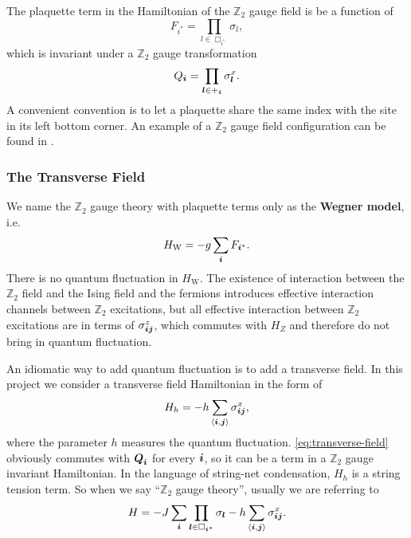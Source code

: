 \documentclass[hyperref, a4paper]{article}
\newcommand*{\pair}[1]{\langle #1 \rangle}
\newcommand*{\concept}[1]{{\textbf{#1}}}
\newcommand*{\Ztwo}{$\mathbb{Z}_2$ }
\begin{document}
The plaquette term in the Hamiltonian of the \Ztwo gauge field is be a function of
\begin{equation}
    F_{i^*} = \prod_{l \in \Box_{i^*}} \sigma_l,
\end{equation}
which is invariant under a \Ztwo gauge transformation
\begin{equation}
    Q_{\vb*{i}} = \prod_{\vb*{l} \in +_{\vb*{i}}} \sigma^x_{\vb*{l}}.
\end{equation}
A convenient convention is to let a plaquette share the same index with the site in its left bottom corner. 
An example of a \Ztwo gauge field configuration can be found in .

\subsubsection{The Transverse Field}

We name the \Ztwo gauge theory with plaquette terms only as the \concept{Wegner model}, i.e.
\begin{equation}
    H_\text{W} = - g \sum_{\vb*{i}} F_{{\vb*{i}}^*}.
\end{equation}
There is no quantum fluctuation in $H_\text{W}$. 
The existence of interaction between the \Ztwo field and the Ising field and the fermions introduces effective interaction channels between \Ztwo excitations, but all effective interaction between \Ztwo excitations are in terms of $\sigma^z_{\vb*{i} \vb*{j}}$, which commutes with $H_Z$ and therefore do not bring in quantum fluctuation.

An idiomatic way to add quantum fluctuation is to add a transverse field.
In this project we consider a transverse field Hamiltonian in the form of 
\begin{equation}
    H_h = - h \sum_{\pair{\vb*{i}, \vb*{j}}} \sigma_{\vb*{i} \vb*{j}}^x ,
    \label{eq:transverse-field}
\end{equation}
where the parameter $h$ measures the quantum fluctuation.
\eqref{eq:transverse-field} obviously commutes with $\vb*{Q}_{\vb*{i}}$ for every $\vb*{i}$, so it can be a term in a \Ztwo gauge invariant Hamiltonian. 
In the language of string-net condensation, $H_h$ is a string tension term.
So when we say ``\Ztwo gauge theory'', usually we are referring to 
\begin{equation}
    H = - J \sum_{\vb*{i}} \prod_{\vb*{l} \in \Box_{\vb*{i}^*}} \sigma_{\vb*{l}} - h \sum_{\pair{\vb*{i}, \vb*{j}}} \sigma_{\vb*{i} \vb*{j}}^x.
    \label{eq:standard-z2-theory}
\end{equation}
\end{document}
